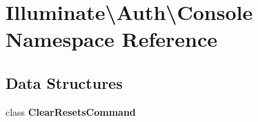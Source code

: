 \section{Illuminate\textbackslash{}Auth\textbackslash{}Console Namespace Reference}
\label{namespace_illuminate_1_1_auth_1_1_console}
\subsection*{Data Structures}
\begin{DoxyCompactItemize}
\item 
class {\bf Clear\+Resets\+Command}
\end{DoxyCompactItemize}
